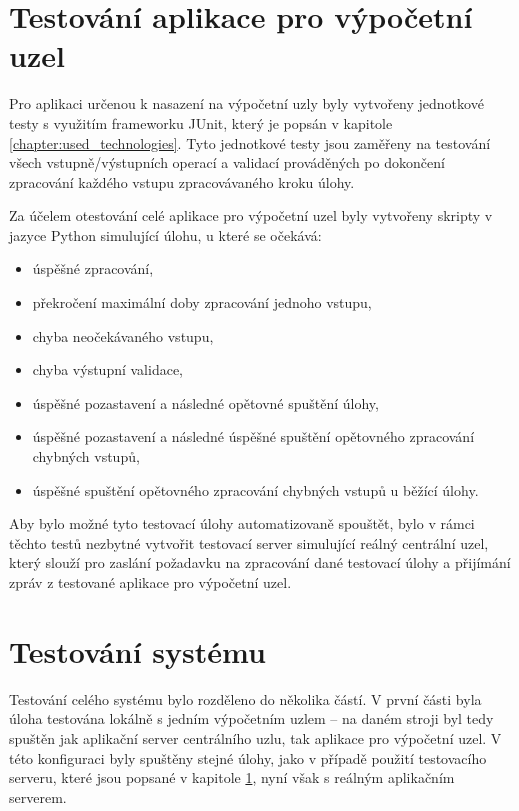 \section{Testování aplikace pro výpočetní uzel}
\label{section:testingSecondaryNode}

Pro aplikaci určenou k nasazení na výpočetní uzly byly vytvořeny jednotkové testy s využitím frameworku JUnit, který je popsán v kapitole \ref{chapter:used_technologies}. Tyto jednotkové testy jsou zaměřeny na testování všech vstupně/výstupních operací a validací prováděných po dokončení zpracování každého vstupu zpracovávaného kroku úlohy. 

Za účelem otestování celé aplikace pro výpočetní uzel byly vytvořeny skripty v jazyce Python simulující úlohu, u které se očekává:
\begin{itemize}
    \item úspěšné zpracování,
    \item překročení maximální doby zpracování jednoho vstupu,
    \item chyba neočekávaného vstupu,
    \item chyba výstupní validace,
    \item úspěšné pozastavení a následné opětovné spuštění úlohy,
    \item úspěšné pozastavení a následné úspěšné spuštění opětovného zpracování chybných vstupů,
    \item úspěšné spuštění opětovného zpracování chybných vstupů u běžící úlohy.
\end{itemize}

Aby bylo možné tyto testovací úlohy automatizovaně spouštět, bylo v rámci těchto testů nezbytné vytvořit testovací server simulující reálný centrální uzel, který slouží pro zaslání požadavku na zpracování dané testovací úlohy a přijímání zpráv z testované aplikace pro výpočetní uzel.

\section{Testování systému}

Testování celého systému bylo rozděleno do několika částí. V první části byla úloha testována lokálně s jedním výpočetním uzlem -- na daném stroji byl tedy spuštěn jak aplikační server centrálního uzlu, tak aplikace pro výpočetní uzel. V této konfiguraci byly spuštěny stejné úlohy, jako v případě použití testovacího serveru, které jsou popsané v kapitole \ref{section:testingSecondaryNode}, nyní však s reálným aplikačním serverem. 


